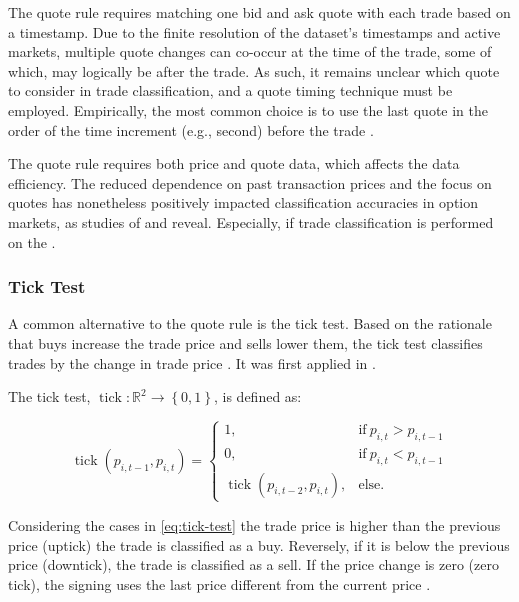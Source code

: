 The quote rule requires matching one bid and ask quote with each trade based on a timestamp. Due to the finite resolution of the dataset's timestamps and active markets, multiple quote changes can co-occur at the time of the trade, some of which, may logically be after the trade. As such, it remains unclear which quote to consider in trade classification, and a quote timing technique must be employed. Empirically, the most common choice is to use the last quote in the order of the time increment (e.g., second) before the trade \autocite[][1765]{holdenLiquidityMeasurementProblems2014}.

The quote rule requires both price and quote data, which affects the data efficiency. The reduced dependence on past transaction prices and the focus on quotes has nonetheless positively impacted classification accuracies in option markets, as studies of \textcite[][886]{savickasInferringDirectionOption2003} and \textcite[][3]{grauerOptionTradeClassification2022} reveal. Especially, if trade classification is performed on the .


\subsubsection{Tick Test}\label{sec:tick-test}

A common alternative to the quote rule is the tick test. Based on the rationale that buys increase the trade price and sells lower them, the tick test classifies trades by the change in trade price \autocite[][271]{easleyDiscerningInformationTrade2016}. It was first applied in \textcites[][244]{holthausenEffectLargeBlock1987}[][240]{hasbrouckTradesQuotesInventories1988}.

The tick test, $\operatorname{tick}\colon \mathbb{R}^2 \to \left\{0,1\right\}$, is defined as:

\begin{equation}
  \operatorname{tick}(p_{i, t-1}, p_{i,t})=
  \begin{cases}
    1,                                       & \text{if}\ p_{i, t} > p_{i, t-1} \\
    0,                                       & \text{if}\ p_{i, t} < p_{i, t-1} \\
    \operatorname{tick}(p_{i,t-2}, p_{i,t}), & \text{else}.
  \end{cases}
  \label{eq:tick-test}
\end{equation}


Considering the cases in \cref{eq:tick-test} the trade price is higher than the previous price (uptick) the trade is classified as a buy. Reversely, if it is below the previous price (downtick), the trade is classified as a sell. If the price change is zero (zero tick), the signing uses the last price different from the current price \autocite[][3]{leeInferringTradeDirection1991}.

